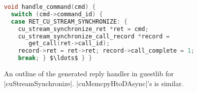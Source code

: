 
\begin{figure}
\begin{lstlisting}[language=C,columns=flexible,mathescape,belowskip=0em,aboveskip=0em,basicstyle={\scriptsize\ttfamily}]
void handle_command(cmd) {
  switch (cmd->command_id) {
  case RET_CU_STREAM_SYNCHRONIZE: {
    cu_stream_synchronize_ret *ret = cmd;
    cu_stream_synchronize_call_record *record = 
       get_call(ret->call_id);
    record->ret = ret->ret; record->call_complete = 1;
    break; } $\ldots$ } }
\end{lstlisting}
\caption{An outline of the generated reply handler in guestlib for \spec|cuStreamSynchronize|.
\spec|cuMemcpyHtoDAsync|'s is similar.}
\label{fig:generated-code-outline-guest-handle}
\vspace*{-1em}
\end{figure}
